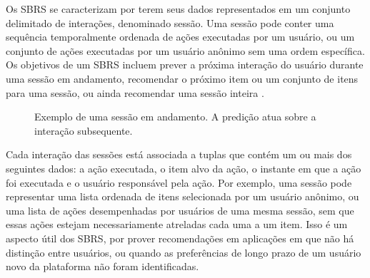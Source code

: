 Os SBRS se caracterizam por terem seus dados representados em um conjunto
delimitado de interações, denominado sessão. Uma sessão pode conter uma
sequência temporalmente ordenada de ações executadas por um usuário, ou um
conjunto de ações executadas por um usuário anônimo sem uma ordem específica.
Os objetivos de um SBRS
incluem prever a próxima interação do usuário durante uma sessão em andamento,
recomendar o próximo item ou um conjunto de itens para uma sessão, ou ainda
recomendar uma sessão inteira \cite{domingues_large_2023, survey_wang_2021}.


    



\begin{figure}[h]
    \centering
    \caption{Exemplo de uma sessão em andamento. A predição atua sobre a interação subsequente.}
\end{figure}

Cada interação das sessões está associada a tuplas que contém um ou mais dos
seguintes dados: a ação executada, o item alvo da ação, o instante em que a ação
foi executada e o usuário responsável pela ação. Por exemplo, uma sessão pode
representar uma lista ordenada de itens selecionada por um usuário anônimo, ou
uma lista de ações desempenhadas por usuários de uma mesma sessão, sem que essas
ações estejam necessariamente atreladas cada uma a um item. Isso é um aspecto
útil dos SBRS, por prover recomendações em aplicações em que não há
distinção entre usuários, ou quando as preferências de longo prazo de um
usuário novo da plataforma não foram identificadas.
\vspace{0.4cm}